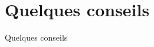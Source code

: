 \section{Quelques conseils}

\begingroup
\begin{frame}
    \begin{center}
        \vspace{1cm}
        {\Large\color{foreground}
            Quelques conseils
        }
    \end{center}
\end{frame}
\endgroup
